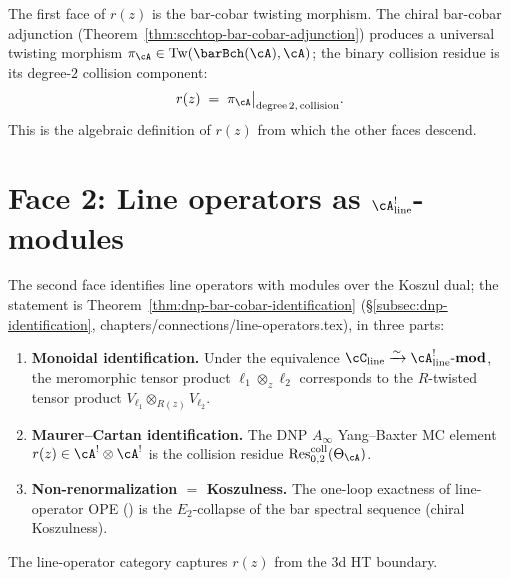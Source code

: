 The first face of $r(z)$ is the bar-cobar twisting morphism. The
chiral bar-cobar adjunction
(Theorem~\ref{thm:scchtop-bar-cobar-adjunction}) produces a
universal twisting morphism
$\pi_\cA \in \mathrm{Tw}(\barBch(\cA), \cA)$; the binary collision
residue is its degree-$2$ collision component:
\[
r(z)
\;=\;
\pi_\cA\big|_{\mathrm{degree}\,2,\,\mathrm{collision}}.
\]
This is the algebraic definition of $r(z)$ from which the other
faces descend.

\section{Face 2: Line operators as $\cA^!_{\mathrm{line}}$-modules}
\label{sec:face-2-line-operators}

The second face identifies line operators with modules over the
Koszul dual; the statement is
Theorem~\ref{thm:dnp-bar-cobar-identification}
(\S\ref{subsec:dnp-identification},
chapters/connections/line-operators.tex), in three parts:

\begin{enumerate}[label=\textup{(\roman*)}]
\item \textbf{Monoidal identification.} Under the equivalence
 $\cC_{\mathrm{line}} \xrightarrow{\sim}
 \cA^!_{\mathrm{line}}\text{-}\mathbf{mod}$, the meromorphic tensor
 product $\ell_1 \otimes_z \ell_2$ corresponds to the $R$-twisted
 tensor product $V_{\ell_1} \otimes_{R(z)} V_{\ell_2}$.
\item \textbf{Maurer--Cartan identification.} The DNP $A_\infty$
 Yang--Baxter MC element $r(z) \in \cA^! \otimes \cA^!$ is the
 collision residue $\operatorname{Res}^{\mathrm{coll}}_{0,2}(\Theta_\cA)$.
\item \textbf{Non-renormalization $=$ Koszulness.} The one-loop
 exactness of line-operator OPE \textup{(\cite[Thm.\,4.1]{DNP25})} is
 the $E_2$-collapse of the bar spectral sequence (chiral Koszulness).
\end{enumerate}

The line-operator category captures $r(z)$ from the 3d HT
boundary.

